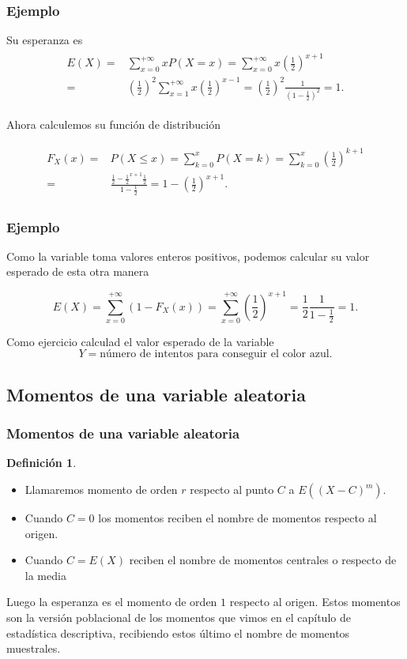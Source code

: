 \documentclass[handout]{beamer}\usepackage[]{graphicx}\usepackage[]{color}
\renewcommand{\emph}[1]{{\color{red}#1}}
\renewcommand{\leq}{\leqslant}
\theoremstyle{plain}
\theoremstyle{definition}
\newtheorem{definicion}{Definición}
\begin{document}
\begin{frame}
\frametitle{Ejemplo}
Su esperanza es 
\begin{align*}
\begin{split}
E(X)=&\sum_{x=0}^{+\infty} x P(X=x)=\sum_{x=0}^{+\infty} x
\left(\frac{1}{2}\right)^{x+1}\\
= & 
\left(\frac{1}{2}\right)^2\sum_{x=1}^{+\infty} x
\left(\frac{1}{2}\right)^{x-1}=\left(\frac{1}{2}\right)^2
\frac{1}{\left(1-\frac{1}{2}\right)^2}=1.
\end{split}
\end{align*}



Ahora calculemos su función de distribución

\begin{align*}
\begin{split}
F_X(x)=& P(X\leq x)=\sum_{k=0}^x P(X=k)=\sum_{k=0}^x
\left(\frac{1}{2}\right)^{k+1}\\
=& \frac{\frac{1}{2}-\frac{1}{2}^{x+1}
\frac{1}{2}}{1-\frac{1}{2}}=1-\left(\frac{1}{2}\right)^{x+1}.
\end{split}
\end{align*}
\end{frame}



\begin{frame}
\frametitle{Ejemplo}

Como la variable toma valores enteros positivos, podemos calcular su valor esperado
de esta otra manera

$$E(X)=\sum_{x=0}^{+\infty} (1-F_X(x))=\sum_{x=0}^{+\infty}(\frac{1}{2})^{x+1}=\frac{1}{2}
\frac{1}{1-\frac{1}{2}}=1.$$

Como ejercicio  calculad el valor esperado de la variable
$$Y=\mbox{número de intentos
para conseguir el color azul.}$$

\end{frame}

\subsection{Momentos de una variable aleatoria}
\begin{frame}
\frametitle{Momentos de una variable aleatoria}

\begin{definicion}
\begin{itemize}
\item Llamaremos  \emph{momento de orden $r$} respecto al punto $C$ a $E\left((X-C)^m\right)$.
\item Cuando $C=0$ los momentos reciben el nombre de \emph{momentos respecto al origen}.
\item Cuando $C=E(X)$ reciben el nombre de \emph{momentos centrales o respecto de la media}
\end{itemize}
\end{definicion}


Luego la esperanza es el momento de orden $1$ respecto al origen. 
Estos momentos son la versión poblacional de los momentos que vimos en el capítulo de estadística descriptiva, recibiendo estos último el nombre de momentos muestrales.

\end{frame}
\end{document}
